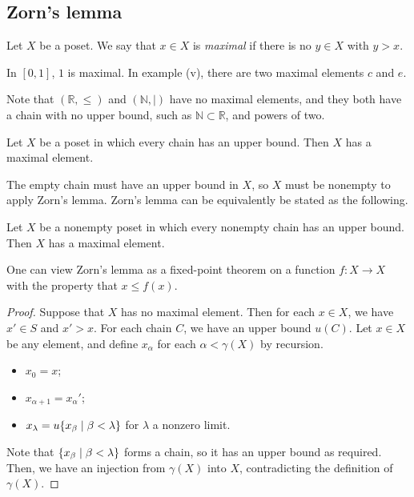 \subsection{Zorn's lemma}
\begin{definition}
    Let \( X \) be a poset.
    We say that \( x \in X \) is \emph{maximal} if there is no \( y \in X \) with \( y > x \).
\end{definition}
\begin{example}
    In \( [0,1] \), \( 1 \) is maximal.
    In example (v), there are two maximal elements \( c \) and \( e \).
\end{example}
Note that \( (\mathbb R, \leq) \) and \( (\mathbb N, \mid) \) have no maximal elements, and they both have a chain with no upper bound, such as \( \mathbb N \subset \mathbb R \), and powers of two.
\begin{theorem}
    Let \( X \) be a poset in which every chain has an upper bound.
    Then \( X \) has a maximal element.
\end{theorem}
The empty chain must have an upper bound in \( X \), so \( X \) must be nonempty to apply Zorn's lemma.
Zorn's lemma can be equivalently be stated as the following.
\begin{theorem}
    Let \( X \) be a nonempty poset in which every nonempty chain has an upper bound.
    Then \( X \) has a maximal element.
\end{theorem}
One can view Zorn's lemma as a fixed-point theorem on a function \( f \colon X \to X \) with the property that \( x \leq f(x) \).
\begin{proof}
    Suppose that \( X \) has no maximal element.
    Then for each \( x \in X \), we have \( x' \in S \) and \( x' > x \).
    For each chain \( C \), we have an upper bound \( u(C) \).
    Let \( x \in X \) be any element, and define \( x_\alpha \) for each \( \alpha < \gamma(X) \) by recursion.
    \begin{itemize}
        \item \( x_0 = x \);
        \item \( x_{\alpha + 1} = x_\alpha' \);
        \item \( x_\lambda = u\qty{x_\beta \mid \beta < \lambda} \) for \( \lambda \) a nonzero limit.
    \end{itemize}
    Note that \( \qty{x_\beta \mid \beta < \lambda} \) forms a chain, so it has an upper bound as required.
    Then, we have an injection from \( \gamma(X) \) into \( X \), contradicting the definition of \( \gamma(X) \).
\end{proof}
